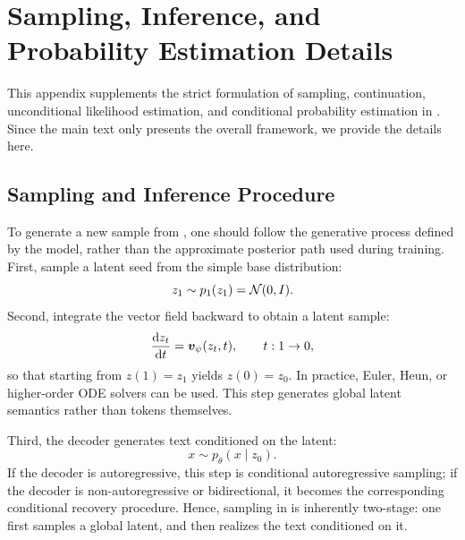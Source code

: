 \section{Sampling, Inference, and Probability Estimation Details}
\label{app:inference_and_likelihood}

This appendix supplements the strict formulation of sampling, continuation, unconditional likelihood estimation, and conditional probability estimation in \method. Since the main text only presents the overall framework, we provide the details here.

\subsection{Sampling and Inference Procedure}
\label{app:sampling}

To generate a new sample from \method, one should follow the generative process defined by the model, rather than the approximate posterior path used during training. First, sample a latent seed from the simple base distribution:
\begin{equation}
z_1\sim p_1(z_1)=\mathcal{N}(0,I).
\label{eq:app_sampling_step1}
\end{equation}
Second, integrate the vector field backward to obtain a latent sample:
\begin{equation}
\frac{\mathrm{d} z_t}{\mathrm{d} t}=\bm{v}_{\psi}(z_t,t),
\qquad t:1\rightarrow 0,
\label{eq:app_sampling_reverse_ode}
\end{equation}
so that starting from $z(1)=z_1$ yields $z(0)=z_0$. In practice, Euler, Heun, or higher-order ODE solvers can be used. This step generates global latent semantics rather than tokens themselves.

Third, the decoder generates text conditioned on the latent:
\begin{equation}
x\sim p_{\theta}(x\mid z_0).
\label{eq:app_sampling_step_decoder}
\end{equation}
If the decoder is autoregressive, this step is conditional autoregressive sampling; if the decoder is non-autoregressive or bidirectional, it becomes the corresponding conditional recovery procedure. Hence, sampling in \method is inherently two-stage: one first samples a global latent, and then realizes the text conditioned on it.

